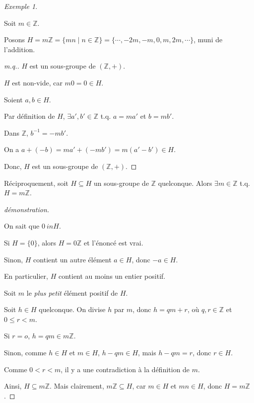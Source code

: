 \documentclass{report}
\newcommand*{\entiers}{\mathbb{Z}}
\theoremstyle{definition}
\theoremstyle{remark}
\newtheorem*{exem}{Exemple}
\begin{document}
	\begin{exem}~

		Soit $m \in \entiers$.

		Posons $H = m\entiers = \{mn \mid n \in \entiers\} = \{\dotsb,-2m,-m,0,m,2m,\dotsb\}$, muni de l'addition.
		\begin{proof}[m.q.]
			$H$ est un sous-groupe de $(\entiers,+)$.

			$H$ est non-vide, car $m0=0 \in H$.

			Soient $a,b \in H$.

			Par d\'efinition de $H$, $\exists a',b' \in \entiers$ t.q. $a=ma'$ et $b=mb'$.

			Dans $\entiers$, $b^{-1} = -mb'$.

			On a $a+(-b) = ma' + (-mb') = m(a'-b') \in H$.

			Donc, $H$ est un sous-groupe de $(\entiers,+)$.
		\end{proof}

		R\'eciproquement, soit $H \subseteq H$ un sous-groupe de $\entiers$ quelconque. Alors $\exists m \in \entiers$ t.q. $H=m\entiers$.
		\begin{proof}[d\'emonstration]~

			On sait que $0\ in H$.

			Si $H=\{0\}$, alors $H=0\entiers$ et l'\'enonc\'e est vrai.

			Sinon, $H$ contient un autre \'el\'ement $a \in H$, donc $-a \in H$.

			En particulier, $H$ contient au moins un entier positif.

			Soit $m$ le \emph{plus petit} \'el\'ement positif de $H$.

			Soit $h \in H$ quelconque. On divise $h$ par $m$, donc $h=qm+r$, o\`u $q,r \in \entiers$ et $0 \leq r < m$.

			Si $r=o$, $h=qm \in m\entiers$.

			Sinon, comme $h \in H$ et $m \in H$, $h-qm \in H$, mais $h-qm=r$, donc $r \in H$.

			Comme $0<r<m$, il y a une contradiction \`a la d\'efinition de $m$.
			\begin{flushright}
				\lightning
			\end{flushright}

			Ainsi, $H \subseteq m\entiers$. Mais clairement, $m\entiers \subseteq H$, car $m \in H$ et $mn \in H$, donc $H=m\entiers$.
		\end{proof}
	\end{exem}
\end{document}
